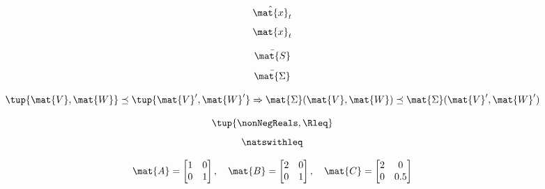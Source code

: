 {\begin{forslides}
    \begin{equation}
        \label{eq:x_estimate}
        \hat{\mat{x}}_t
    \end{equation}
    \begin{equation}
        \label{eq:x_real}
        \mat{x}_t
    \end{equation}

    \begin{equation}
        \label{eq:ric_1}
        \bar{\mat{S}}
    \end{equation}
    \begin{equation}
        \label{eq:ric_2}
        \bar{\mat{\Sigma}}
    \end{equation}

    \begin{equation}
        \label{eq:mon_est}
        \tup{\mat{V},\mat{W}}\preceq \tup{\mat{V}',\mat{W}'} \Rightarrow \mat{\Sigma}(\mat{V},\mat{W})\preceq \mat{\Sigma}(\mat{V}',\mat{W}')
    \end{equation}

    \begin{equation}
        \label{eq:posreals}
        \tup{\nonNegReals,{{\Rleq}}}
    \end{equation}
    \begin{equation}
        \label{eq:nats}
        \natswithleq
    \end{equation}

    \begin{equation}
        \label{eq:matrix_poset}
        \mat{A}=\begin{bmatrix}
            1 & 0 \\0& 1
        \end{bmatrix}, \quad \mat{B}=\begin{bmatrix}
            2 & 0 \\0& 1
        \end{bmatrix},\quad \mat{C}=\begin{bmatrix}
            2 & 0 \\0& 0.5
        \end{bmatrix}
    \end{equation}


\end{forslides}}
